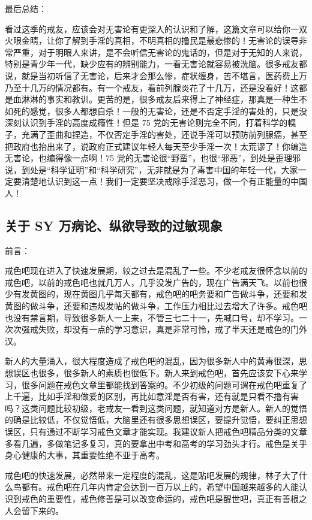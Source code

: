 最后总结：

看过这季的戒友，应该会对无害论有更深入的认识和了解，这篇文章可以给你一双火眼金睛，让你了解到手淫的真相，不明真相的撸民是最悲惨的！无害论的误导非常严重，对于明眼人来讲，是不会听信无害论的鬼话的，但是对于无知的人来说，特别是青少年一代，缺少应有的辨别能力，一看无害论就容易被洗脑。很多戒友都说，就是当初听信了无害论，后来才会那么惨，症状缠身，苦不堪言，医药费上万乃至十几万的情况都有。有一个戒友，看前列腺炎花了十几万，还是没看好！这都是血淋淋的事实和教训。更苦的是，很多戒友后来得上了神经症，那真是一种生不如死的感觉，很多人都想自杀！一般的无害论，还是不否定手淫的害处的，只是没深刻认识到手淫的高度成瘾性！但是 75 党的无害论则完全不同，打着科学的幌子，充满了歪曲和捏造，不仅否定手淫的害处，还说手淫可以预防前列腺癌，甚至把政府也抬出来了，说政府正式建议年轻人每天至少手淫一次！太荒谬了！你编造无害论，也编得像一点啊！75 党的无害论很“野蛮”，也很“邪恶”，到处是歪理邪说，到处是“科学证明”和“科学研究”，无非就是为了毒害中国的年轻一代，大家一定要清楚地认识到这一点！我们一定要坚决戒除手淫恶习，做一个有正能量的中国人！

\subsection{关于 SY 万病论、纵欲导致的过敏现象}

前言：

戒色吧现在进入了快速发展期，较之过去是混乱了一些。不少老戒友很怀念以前的戒色吧，以前的戒色吧也就几万人，几乎没发广告的，现在广告满天飞。以前也很少有发黄图的，现在黄图几乎每天都有，戒色吧的吧务要和广告做斗争，还要和发黄图的做斗争，还要和违规发帖的做斗争，工作压力相比过去增大了许多。戒色吧也没有禁言期，导致很多新人一上来，不管三七二十一，先喊口号，却不学习。一次次强戒失败，却没有一点的学习意识，真是非常可怜，戒了半天还是戒色的门外汉。

新人的大量涌入，很大程度造成了戒色吧的混乱，因为很多新人中的黄毒很深，思想误区也很多，很多新人的素质也很低下。新人来到戒色吧，首先应该安下心来学习，很多问题在戒色文章里都能找到答案的。不少初级的问题可谓在戒色吧重复了上千遍，比如手淫和做爱的区别，再比如意淫是否有害，还有就是只看不撸有害吗？这类问题比较初级，老戒友一看到这类问题，就知道对方是新人。新人的觉悟的确是比较低，不仅觉悟低，大脑里还有很多思想误区，要提升觉悟，要纠正思想误区，只有通过不断学习戒色文章才能实现。我建议新人把戒色吧精品分类的文章多看几遍，多做笔记多复习，真的要拿出中考和高考的学习劲头才行。戒色是关乎身心健康的大事，其重要性绝不亚于高考。

戒色吧的快速发展，必然带来一定程度的混乱，这是贴吧发展的规律，林子大了什么鸟都有。戒色吧在几年内肯定会达到一百万以上的，希望中国越来越多的人能认识到戒色的重要性，戒色修善是可以改变命运的，戒色吧是醒世吧，真正有善根之人会留下来的。

